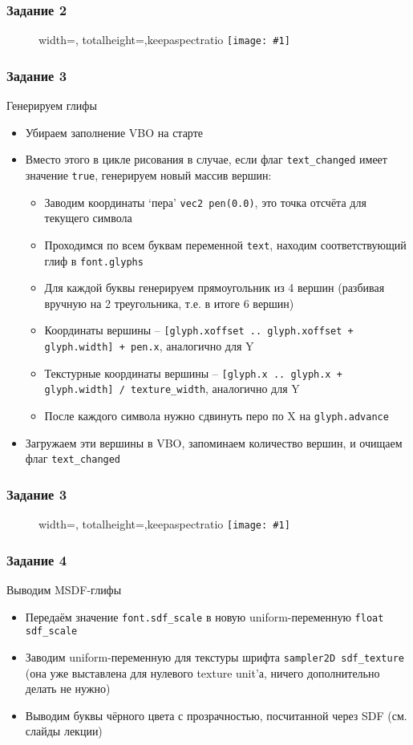 \documentclass{beamer}
\newcommand{\slideimage}[1]{
  \begin{figure}
    \begin{adjustbox}{width=\textwidth, totalheight=\textheight-2\baselineskip-2\baselineskip,keepaspectratio}
      \texttt{[image: \#1]}
    \end{adjustbox}
  \end{figure}
}
\begin{document}
\begin{frame}
\frametitle{Задание 2}
\slideimage{2.png}
\end{frame}

\begin{frame}[fragile]
\frametitle{Задание 3}
\fontsize{8pt}{8pt}
\selectfont
Генерируем глифы
\begin{itemize}
\item Убираем заполнение VBO на старте
\item Вместо этого в цикле рисования в случае, если флаг \verb|text_changed| имеет значение \verb|true|, генерируем новый массив вершин:
\begin{itemize}
\fontsize{8pt}{8pt}
\selectfont
\item Заводим координаты `пера' \verb|vec2 pen(0.0)|, это точка отсчёта для текущего символа
\item Проходимся по всем буквам переменной \verb|text|, находим соответствующий глиф в \verb|font.glyphs|
\item Для каждой буквы генерируем прямоугольник из 4 вершин (разбивая вручную на 2 треугольника, т.е. в итоге 6 вершин)
\item Координаты вершины -- \verb|[glyph.xoffset .. glyph.xoffset + glyph.width] + pen.x|, аналогично для Y
\item Текстурные координаты вершины -- \verb|[glyph.x .. glyph.x + glyph.width] / texture_width|, аналогично для Y
\item После каждого символа нужно сдвинуть перо по X на \verb|glyph.advance|
\end{itemize}
\item Загружаем эти вершины в VBO, запоминаем количество вершин, и очищаем флаг \verb|text_changed|
\end{itemize}
\end{frame}

\begin{frame}
\frametitle{Задание 3}
\slideimage{3.png}
\end{frame}

\begin{frame}[fragile]
\frametitle{Задание 4}
Выводим MSDF-глифы
\begin{itemize}
\item Передаём значение \verb|font.sdf_scale| в новую uniform-переменную \verb|float sdf_scale|
\item Заводим uniform-переменную для текстуры шрифта \verb|sampler2D sdf_texture| (она уже выставлена для нулевого texture unit'а, ничего дополнительно делать не нужно)
\item Выводим буквы чёрного цвета с прозрачностью, посчитанной через SDF (см. слайды лекции)
\end{itemize}
\end{frame}
\end{document}
